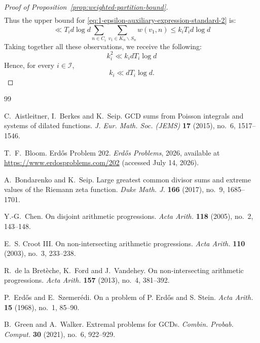 \documentclass[11pt]{amsart}
\theoremstyle{remark}
\begin{document}
\begin{proof}[Proof of Proposition~\ref{prop:weighted-partition-bound}]
\begin{align}
  \end{align}
  Thus the upper bound for \eqref{eq:1-epsilon-auxiliary-expression-standard-2} is:
  \begin{equation}
     \ll T_id \log d  \sum_{n \in C_i} \sum_{v_1 \in K_n \backslash S_n} w(v_1, n) \leq k_i T_i d \log d
  \end{equation}
  Taking together all these observations, we receive the following:
  \begin{equation}
    k_i^2 \ll k_idT_i \log d
  \end{equation}
  Hence, for every $i\in\mathcal I$,
  \[
    k_i\ll dT_i\log d.
  \]
\end{proof}

\begin{thebibliography}{99}

C.~Aistleitner, I.~Berkes and K.~Seip.
\newblock GCD sums from Poisson integrals and systems of dilated functions.
\newblock \emph{J. Eur. Math. Soc. (JEMS)} \textbf{17} (2015), no.~6,
1517--1546.

T.~F.~Bloom.
\newblock Erd\H{o}s Problem 202.
\newblock \emph{Erd\H{o}s Problems}, 2026, available at
\url{https://www.erdosproblems.com/202}
(accessed July 14, 2026).

A.~Bondarenko and K.~Seip.
\newblock Large greatest common divisor sums and extreme values of the Riemann
zeta function.
\newblock \emph{Duke Math. J.} \textbf{166} (2017), no.~9, 1685--1701.

Y.-G.~Chen.
\newblock On disjoint arithmetic progressions.
\newblock \emph{Acta Arith.} \textbf{118} (2005), no.~2, 143--148.

E.~S. Croot III.
\newblock On non-intersecting arithmetic progressions.
\newblock \emph{Acta Arith.} \textbf{110} (2003), no.~3, 233--238.

R.~de la Bret\`eche, K.~Ford and J.~Vandehey.
\newblock On non-intersecting arithmetic progressions.
\newblock \emph{Acta Arith.} \textbf{157} (2013), no.~4, 381--392.

P.~Erd\H{o}s and E.~Szemer\'edi.
\newblock On a problem of P. Erd\H{o}s and S. Stein.
\newblock \emph{Acta Arith.} \textbf{15} (1968), no.~1, 85--90.

B.~Green and A.~Walker.
\newblock Extremal problems for GCDs.
\newblock \emph{Combin. Probab. Comput.} \textbf{30} (2021), no.~6, 922--929.


\end{thebibliography}
\end{document}
